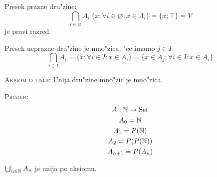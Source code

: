 Presek prazne dru"zine:
\begin{equation*}
\bigcap_{i \in \varnothing} A_i \ \{x; \forall i \in \varnothing: x \in A_i\} = \{x; \top\} = V
\end{equation*}
je pravi razred.

Presek neprazne dru"zine je mno"zica, "ce imamo $j \in I$
\begin{equation*}
\bigcap_{i \in I} A_i = \{x; \forall i \in I: x \in A_i\} = \{x \in A_j; \forall i \in I: x \in A_i\}
\end{equation*}

\textsc{Aksiom o uniji: } Unija dru"zine mno"zic je mno"zica.

\textsc{Primer:}
\begin{gather*}
A : \mathbb{N} \rightarrow \text{Set}\\
A_0 = \mathbb{N}\\
A_1 = P(\mathbb{N})\\
A_2 = P(P(\mathbb{N}))\\
A_{n+1} = P(A_n)
\end{gather*}

$\bigcup_{n \in \mathbb{N}} A_n$ je unija po aksiomu.
